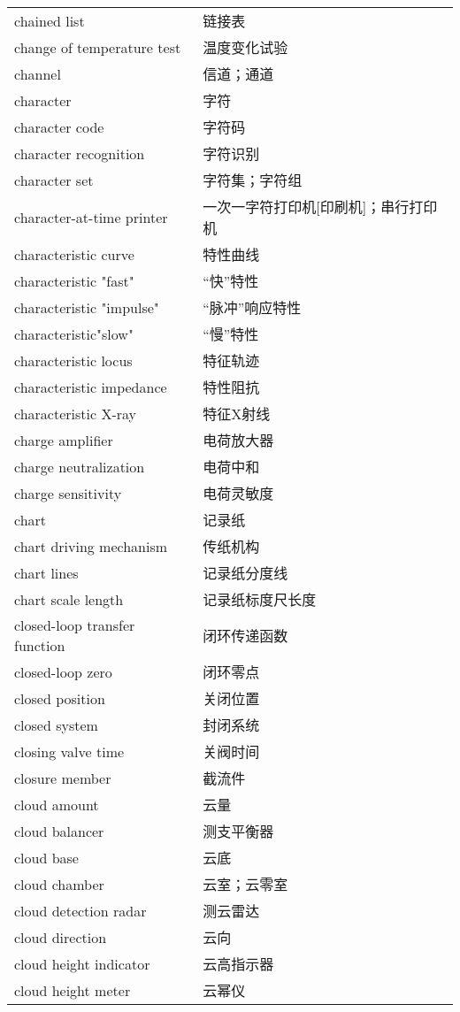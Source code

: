 \documentclass[
]{article}
\begin{document}
\begin{longtable}[]{@{}ll@{}}
chained list & 链接表 \\
change of temperature test & 温度变化试验 \\
channel & 信道；通道 \\
character & 字符 \\
character code & 字符码 \\
character recognition & 字符识别 \\
character set & 字符集；字符组 \\
character-at-time printer & 一次一字符打印机{[}印刷机{]}；串行打印机 \\
characteristic curve & 特性曲线 \\
characteristic "fast" & ``快''特性 \\
characteristic "impulse" & ``脉冲''响应特性 \\
characteristic"slow" & ``慢''特性 \\
characteristic locus & 特征轨迹 \\
characteristic impedance & 特性阻抗 \\
characteristic X-ray & 特征X射线 \\
charge amplifier & 电荷放大器 \\
charge neutralization & 电荷中和 \\
charge sensitivity & 电荷灵敏度 \\
chart & 记录纸 \\
chart driving mechanism & 传纸机构 \\
chart lines & 记录纸分度线 \\
chart scale length & 记录纸标度尺长度 \\
closed-loop transfer function & 闭环传递函数 \\
closed-loop zero & 闭环零点 \\
closed position & 关闭位置 \\
closed system & 封闭系统 \\
closing valve time & 关阀时间 \\
closure member & 截流件 \\
cloud amount & 云量 \\
cloud balancer & 测支平衡器 \\
cloud base & 云底 \\
cloud chamber & 云室；云零室 \\
cloud detection radar & 测云雷达 \\
cloud direction & 云向 \\
cloud height indicator & 云高指示器 \\
cloud height meter & 云幂仪 \\

\end{longtable}
\end{document}

